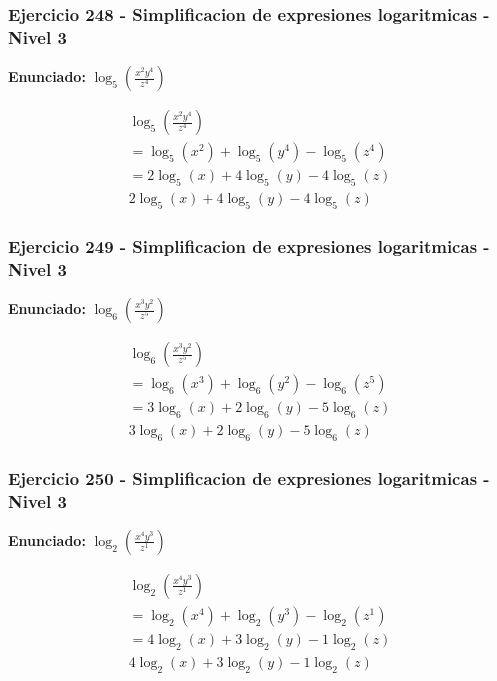 \documentclass[12pt,a4paper]{article}
\begin{document}
\subsubsection*{Ejercicio 248 - Simplificacion de expresiones logaritmicas - Nivel 3}
\textbf{Enunciado:} \(\log_{5}\left(\frac{x^{2}y^{4}}{z^{4}}\right)\)

\[
\begin{aligned}
\log_{5}\left(\frac{x^{2}y^{4}}{z^{4}}\right)\\
=\log_{5}\left(x^{2}\right)+\log_{5}\left(y^{4}\right)-\log_{5}\left(z^{4}\right)\\
=2\log_{5}\left(x\right)+4\log_{5}\left(y\right)-4\log_{5}\left(z\right)\\
\boxed{2\log_{5}\left(x\right)+4\log_{5}\left(y\right)-4\log_{5}\left(z\right)}
\end{aligned}
\]


\subsubsection*{Ejercicio 249 - Simplificacion de expresiones logaritmicas - Nivel 3}
\textbf{Enunciado:} \(\log_{6}\left(\frac{x^{3}y^{2}}{z^{5}}\right)\)

\[
\begin{aligned}
\log_{6}\left(\frac{x^{3}y^{2}}{z^{5}}\right)\\
=\log_{6}\left(x^{3}\right)+\log_{6}\left(y^{2}\right)-\log_{6}\left(z^{5}\right)\\
=3\log_{6}\left(x\right)+2\log_{6}\left(y\right)-5\log_{6}\left(z\right)\\
\boxed{3\log_{6}\left(x\right)+2\log_{6}\left(y\right)-5\log_{6}\left(z\right)}
\end{aligned}
\]


\subsubsection*{Ejercicio 250 - Simplificacion de expresiones logaritmicas - Nivel 3}
\textbf{Enunciado:} \(\log_{2}\left(\frac{x^{4}y^{3}}{z^{1}}\right)\)

\[
\begin{aligned}
\log_{2}\left(\frac{x^{4}y^{3}}{z^{1}}\right)\\
=\log_{2}\left(x^{4}\right)+\log_{2}\left(y^{3}\right)-\log_{2}\left(z^{1}\right)\\
=4\log_{2}\left(x\right)+3\log_{2}\left(y\right)-1\log_{2}\left(z\right)\\
\boxed{4\log_{2}\left(x\right)+3\log_{2}\left(y\right)-1\log_{2}\left(z\right)}
\end{aligned}
\]
\end{document}
